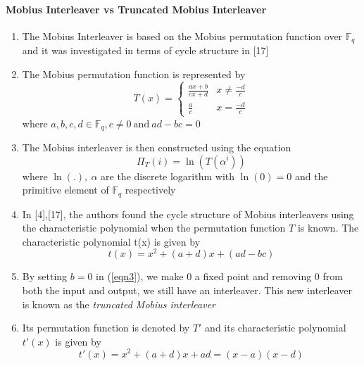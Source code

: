 \documentclass[fontsize=12pt]{article}
\begin{document}
\paragraph{ Mobius Interleaver vs Truncated Mobius Interleaver \newline}
\begin{enumerate}
\item The Mobius Interleaver is based on the Mobius permutation function over $\mathbb{F}_{q}$ and it was investigated in terms of cycle structure in [17]

\item The Mobius permutation function is represented by
\begin{equation}T(x)=\left\{\begin{array}{ll}
\frac{a x+b}{c x+d} & x \neq \frac{-d}{c} \\
\frac{a}{c} & x=\frac{-d}{c}
\end{array}\right.
\label{eqn3}
\end{equation}
where $a,b,c,d \in \mathbb{F}_{q}, c \neq 0 \: \text{and}\: ad - bc =0$

\item The Mobius interleaver is then constructed using the  equation 
\begin{equation}
\Pi_T(i) =\ln(T(\alpha^i))
\end{equation}
where $\ln(.),\: \alpha$ are the discrete logarithm with $\ln(0) = 0$ and the primitive element of $\mathbb{F}_{q}$ respectively

\item In [4],[17], the authors found the cycle structure of Mobius interleavers using the characteristic polynomial when the permutation function $T$ is known. The characteristic polynomial t(x) is given by
\begin{equation}
t(x) =x^2 + (a+d)x +(ad-bc)
\end{equation}

\item By setting $b=0$  in (\ref{eqn3}), we make 0 a fixed point and removing 0 from both the input and output, we still have an interleaver. This new interleaver is known as the \textit{truncated Mobius interleaver} 

\item Its permutation function is denoted by $T'$ and its characteristic polynomial $t'(x)$ is given by 
\begin{equation}
t'(x) =x^2 + (a+d)x +ad = (x-a)(x-d)
\end{equation}


\end{enumerate}
\end{document}
